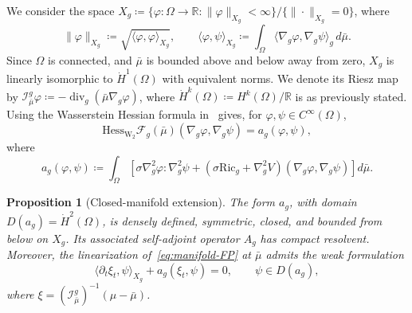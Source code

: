 \documentclass[11pt]{article}
\numberwithin{equation}{section}
\newtheorem{proposition}[theorem]{Proposition}
\theoremstyle{definition}
\newcommand{\R}{\mathbb{R}}
\newcommand{\F}{\mathcal{F}}
\newcommand{\Wtwo}{\operatorname{W}_2}
\newcommand{\rieszmap}[1][\mu]{\mathcal{I}_{#1}}
\newcommand{\dotHk}[1][k]{\dot{H}^{#1}}
\begin{document}
We consider the space $X_g \coloneqq \{\varphi : \Omega \to \R : \|\varphi\|_{X_g} < \infty\} / \{ \|\cdot\|_{X_g} = 0 \}$, where
\[
\|\varphi\|_{X_g} \coloneqq \sqrt{\langle \varphi, \varphi \rangle_{X_g}}, \qquad \langle \varphi, \psi \rangle_{X_g} \coloneqq \int_\Omega \langle \nabla_g\varphi ,\nabla_g\psi \rangle_g \, d\bar\mu.
\]
Since $\Omega$ is connected, and $\bar\mu$ is bounded above and below away from zero, $X_g$ is linearly isomorphic to $\dotHk[1](\Omega)$ with equivalent norms.
We denote its Riesz map by $\rieszmap[\bar\mu]^g \varphi \coloneqq -\operatorname{div}_g (\bar\mu \nabla_g\varphi)$, where $\dotHk[k](\Omega) \coloneqq H^k(\Omega)/\R$ is as previously stated.
Using the Wasserstein Hessian formula in~\cite[Formula~15.7]{villani2008optimal} gives, for $\varphi, \psi \in C^\infty(\Omega)$,
\[
\mathrm{Hess}_{\Wtwo} \F_g(\bar\mu)(\nabla_g\varphi, \nabla_g\psi) = a_g(\varphi,\psi),
\]
where
\[
a_g(\varphi,\psi) \coloneqq \int_\Omega \left[ \sigma \nabla_g^2 \varphi : \nabla_g^2 \psi + \left(\sigma\mathrm{Ric}_g + \nabla_g^2V \right) (\nabla_g\varphi, \nabla_g\psi) \right] d\bar\mu.
\]

\begin{proposition}[Closed-manifold extension]
    \label{prop:closed_manifold_extension}
    The form $a_g$, with domain $D(a_g) = \dotHk[2](\Omega)$, is densely defined, symmetric, closed, and bounded from below on $X_g$. 
    Its associated self-adjoint operator $A_g$ has compact resolvent.
    Moreover, the linearization of~\eqref{eq:manifold-FP} at $\bar\mu$ admits the weak formulation
    \[
    \langle \partial_t\xi_t, \psi\rangle_{X_g} + a_g(\xi_t, \psi) = 0, \qquad \psi \in D(a_g),
    \]
    where $\xi = (\rieszmap[\bar\mu]^g)^{-1} (\mu - \bar\mu)$.
\end{proposition}
\end{document}
